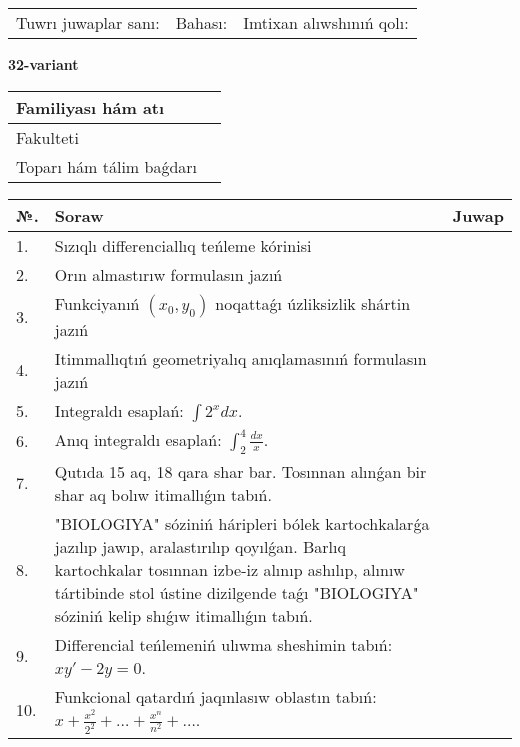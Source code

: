 \documentclass{article}
\begin{document}
\vspace{1cm}

\begin{tabular}{ c c c }
Tuwrı juwaplar sanı: \underline{\hspace{2cm}} & Bahası: \underline{\hspace{2cm}} & Imtixan alıwshınıń qolı: \underline{\hspace{2cm}} \\
\end{tabular}

\newpage

\begin{center}\textbf{32-variant}\end{center}

\bgroup
\def\arraystretch{1.5}
\begin{tabular}{ |m{6cm}|m{10cm}| }
  \hline
  Familiyası hám atı & \\
  \hline
  Fakulteti &\\
  \hline
  Toparı hám tálim baǵdarı & \\
  \hline
\end{tabular}
\egroup

\vspace{0.5cm}

\bgroup
\def\arraystretch{2}
\begin{tabular}{ |l|m{8cm}|m{7cm}| }
  \hline
  №. & Soraw & Juwap \\
  \hline
  1. & Sızıqlı differenciallıq teńleme kórinisi &  \\
  \hline
  2. & Orın almastırıw formulasın jazıń &  \\
  \hline
  3. & Funkciyanıń $(x_{0}, y_{0})$ noqattaǵı úzliksizlik shártin jazıń &  \\
  \hline
  4. & Itimmallıqtıń geometriyalıq anıqlamasınıń formulasın jazıń &  \\
  \hline
  5. & Integraldı esaplań: $\displaystyle\int {2^{x}dx} $. &  \\
  \hline
  6. & Anıq integraldı esaplań: $\displaystyle\int_{2}^{4}\frac{dx}{x}$. &  \\
  \hline
  7. & Qutıda 15 aq, 18 qara shar bar. Tosınnan alınǵan bir shar aq bolıw itimallıǵın tabıń. &  \\
  \hline
  8. & "BIOLOGIYA" sóziniń háripleri bólek kartochkalarǵa jazılıp jawıp, aralastırılıp qoyılǵan. Barlıq kartochkalar tosınnan izbe-iz alınıp ashılıp, alınıw tártibinde stol ústine dizilgende taǵı "BIOLOGIYA" sóziniń kelip shıǵıw itimallıǵın tabıń. &  \\
  \hline
  9. & Differencial teńlemeniń ulıwma sheshimin tabıń: $xy' - 2y = 0$. &  \\
  \hline
  10. & Funkcional qatardıń jaqınlasıw oblastın tabıń: $\displaystyle x + \frac{x^{2}}{2^{2}} + \ldots + \frac{x^{n}}{n^{2}} + \ldots$. &  \\
  \hline
\end{tabular}
\egroup
\end{document}
